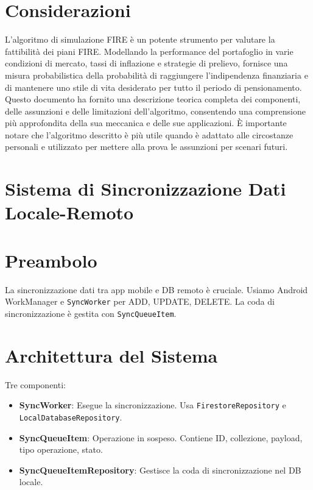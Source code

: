 \documentclass{article}
\begin{document}
    \section{Considerazioni}\label{sec:considerazioni2}

L'algoritmo di simulazione FIRE è un potente strumento per valutare la
fattibilità dei piani FIRE. Modellando la performance del portafoglio in varie
condizioni di mercato, tassi di inflazione e strategie di prelievo, fornisce una
misura probabilistica della probabilità di raggiungere l'indipendenza
finanziaria e di mantenere uno stile di vita desiderato per tutto il periodo di
pensionamento.
Questo documento ha fornito una descrizione teorica completa dei
componenti, delle assunzioni e delle limitazioni dell'algoritmo, consentendo una
comprensione più approfondita della sua meccanica e delle sue applicazioni.
È
importante notare che l'algoritmo descritto è più utile quando è adattato alle
circostanze personali e utilizzato per mettere alla prova le assunzioni per
scenari futuri. \section*{Sistema di Sincronizzazione Dati Locale-Remoto}

\section{Preambolo}\label{sec:preambolo3} La sincronizzazione dati tra app
mobile e DB remoto è cruciale.
Usiamo Android WorkManager e \texttt{SyncWorker}
per ADD, UPDATE, DELETE. La coda di sincronizzazione è gestita con
\texttt{SyncQueueItem}.

\section{Architettura del Sistema}\label{sec:architettura-del-sistema} Tre
componenti:
\begin{itemize}
    \item \textbf{SyncWorker}: Esegue la sincronizzazione.
    Usa
    \texttt{FirestoreRepository} e \texttt{LocalDatabaseRepository}.
    \item \textbf{SyncQueueItem}: Operazione in sospeso.
    Contiene ID,
    collezione, payload, tipo operazione, stato.
    \item \textbf{SyncQueueItemRepository}: Gestisce la coda di sincronizzazione
    nel DB locale.
\end{itemize}
\end{document}
